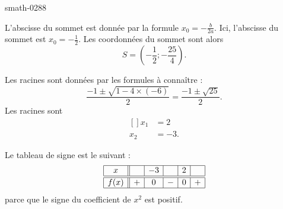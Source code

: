 
\begin{corrige}{smath-0288}

    L'abscisse du sommet est donnée par la formule \( x_0=-\frac{ b }{ 2a }\). Ici, l'abscisse du sommet est \( x_0=-\frac{ 1 }{2}\). Les coordonnées du sommet sont alors
    \begin{equation}
        S=\left( -\frac{ 1 }{2};-\frac{ 25 }{ 4 } \right).
    \end{equation}
    
    Les racines sont données par les formules à connaître :
    \begin{equation}
        \frac{ -1\pm\sqrt{1-4\times (-6)} }{2}=\frac{ -1\pm\sqrt{25} }{ 2 }.
    \end{equation}
    Les racines sont
    \begin{equation}
        \begin{aligned}[]
            x_1&=2\\
            x_2&=-3.
        \end{aligned}
    \end{equation}
    
    Le tableau de signe est le suivant :
    \begin{equation*}
        \begin{array}[]{|c||c|c|c|c|c|}
            \hline
             x&&-3&&2&\\
              \hline\hline
              f(x)&+&0&-&0&+\\ 
              \hline 
               \end{array}
           \end{equation*}
           parce que le signe du coefficient de \( x^2\) est positif.

\end{corrige}
